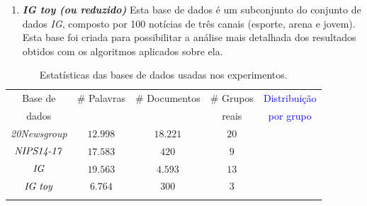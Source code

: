 \documentclass[
    12pt,                %
    oneside,            %
    a4paper,            %
    english,            %
    brazil                %
    ]{abntex2ppgsi}
\begin{document}
\begin{enumerate}

    \item \textbf{\textit{IG toy (ou reduzido)}} Esta base de dados é um subconjunto do conjunto de dados \textit{IG}, composto por 100 notícias de três canais (esporte, arena e jovem). Esta base foi criada para possibilitar a análise mais detalhada dos resultados obtidos com os algoritmos aplicados sobre ela.
\end{enumerate}

\begin{table}[h]
\centering
\caption{Estatísticas das bases de dados usadas nos experimentos.}
\begin{tabular}{ccccc}
\hline
Base de & \# Palavras & \# Documentos & \# Grupos  & \textcolor{blue}{Distribuição} \\
dados   &  &  & reais & \textcolor{blue}{por grupo} \\
\hline
\textit{20Newsgroup}   & $12.998$    & $18.221$      & $20$  &            \\
$\text{\textit{NIPS14-17}}$      & $17.583$    & $420$         & $9$   &           \\
$\text{\textit{IG}}$             & $19.563$    & $4.593$       & $13$  &            \\
$\text{\textit{IG toy}}$         & $6.764$     & $300$        & $3$   &           \\
\hline
& & & & \\
\end{tabular}
\label{tab:datasetsstatsREAL}
\end{table}

\end{document}
